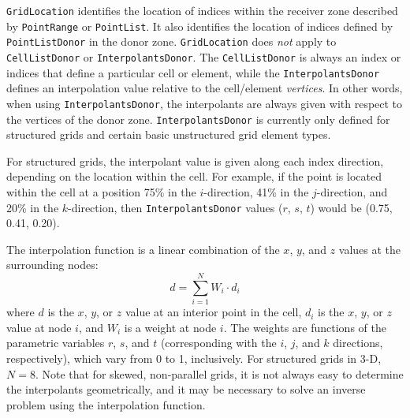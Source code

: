 \texttt{GridLocation} identifies the location of indices within the
receiver zone described by \texttt{PointRange} or \texttt{PointList}.
It also identifies the location of indices defined by
\texttt{PointListDonor} in the donor zone.
\texttt{GridLocation} does \emph{not} apply to \texttt{CellListDonor} or 
\texttt{InterpolantsDonor}.
The \texttt{CellListDonor} is always an index or indices that define a
particular cell or element, while the \texttt{InterpolantsDonor} defines
an interpolation value relative to the cell/element \emph{vertices}.
In other words, when using \texttt{InterpolantsDonor}, the interpolants
are always given with respect to the vertices of the donor zone.
\texttt{InterpolantsDonor} is currently only defined for structured
grids and certain basic unstructured grid element types.

For structured grids, the interpolant value is given along each index
direction, depending on the location within the cell.
For example, if the point is located within the cell at a position 75\%
in the $i$-direction, 41\% in the $j$-direction, and 20\% in the
$k$-direction, then \texttt{InterpolantsDonor} values ($r$, $s$, $t$)
would be (0.75, 0.41, 0.20).

The interpolation function is a linear combination of the $x$, $y$, and
$z$ values at the surrounding nodes:
$$
d = \sum_{i=1}^{N} W_i \cdot d_i
$$
where $d$ is the $x$, $y$, or $z$ value at an interior point in the
cell, $d_i$ is the $x$, $y$, or $z$ value at node $i$, and $W_i$ is a
weight at node $i$.
The weights are functions of the parametric variables $r$, $s$, and $t$
(corresponding with the $i$, $j$, and $k$ directions, respectively),
which vary from 0 to 1, inclusively.
For structured grids in 3-D, $N = 8$.
Note that for skewed, non-parallel grids, it is not always easy to
determine the interpolants geometrically, and it may be necessary to
solve an inverse problem using the interpolation function.

